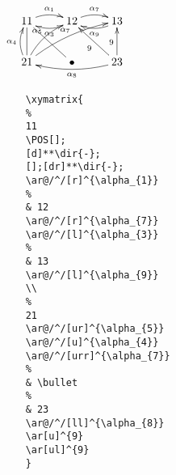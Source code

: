 \documentclass[a4paper,10pt,landscape]{article}
\theoremstyle{definition}
\theoremstyle{remark}
\begin{document}
\begin{multicols}{3}
$
	\xymatrix{
	11
	\POS[];
	[d]**\dir{-};
	[];[dr]**\dir{-};
	\ar@/^/[r]^{\alpha_{1}} 
	& 12
	\ar@/^/[r]^{\alpha_{7}} 
	\ar@/^/[l]^{\alpha_{3}} 
	& 13
	\ar@/^/[l]^{\alpha_{9}} 
	\\
	21
	\ar@/^/[ur]^{\alpha_{5}}
	\ar@/^/[u]^{\alpha_{4}}
	\ar@/^/[urr]^{\alpha_{7}}
	& \bullet
	& 23
	\ar@/^/[ll]^{\alpha_{8}}
	\ar[u]^{9}
	\ar[ul]^{9}
	}
$
\begin{verbatim}
	\xymatrix{
	%
	11
	\POS[];
	[d]**\dir{-};
	[];[dr]**\dir{-};
	\ar@/^/[r]^{\alpha_{1}} 
	%
	& 12
	\ar@/^/[r]^{\alpha_{7}} 
	\ar@/^/[l]^{\alpha_{3}} 
	%
	& 13
	\ar@/^/[l]^{\alpha_{9}} 
	\\
	%
	21
	\ar@/^/[ur]^{\alpha_{5}}
	\ar@/^/[u]^{\alpha_{4}}
	\ar@/^/[urr]^{\alpha_{7}}
	%
	& \bullet
	%
	& 23
	\ar@/^/[ll]^{\alpha_{8}}
	\ar[u]^{9}
	\ar[ul]^{9}
	}
\end{verbatim}




\end{multicols} %





\end{document}
